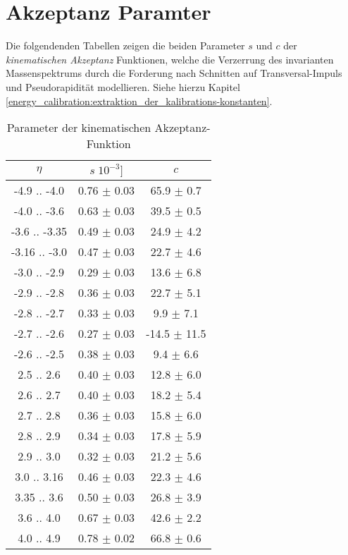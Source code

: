 


\chapter{Akzeptanz Paramter}
Die folgendenden Tabellen zeigen die beiden Parameter $s$ und $c$ der
\textit{kinematischen Akzeptanz} Funktionen, welche die Verzerrung des
invarianten Massenspektrums durch die Forderung nach Schnitten auf
Transversal-Impuls und Pseudorapidität modellieren. Siehe hierzu Kapitel
\ref{energy_calibration:extraktion_der_kalibrations-konstanten}.
\begin{table}[hb]
    \centering
    \begin{tabular}{|c|c|c|}
        \hline
        $\eta$ & $s \; 10^{-3}]$ & $c$  \\
        \hline \hline
        -4.9  .. -4.0  & 0.76 $\pm$ 0.03 &  65.9 $\pm$  0.7 \\
        -4.0  .. -3.6  & 0.63 $\pm$ 0.03 &  39.5 $\pm$  0.5 \\
        -3.6  .. -3.35 & 0.49 $\pm$ 0.03 &  24.9 $\pm$  4.2 \\
        -3.16 .. -3.0  & 0.47 $\pm$ 0.03 &  22.7 $\pm$  4.6 \\
        -3.0  .. -2.9  & 0.29 $\pm$ 0.03 &  13.6 $\pm$  6.8 \\
        -2.9  .. -2.8  & 0.36 $\pm$ 0.03 &  22.7 $\pm$  5.1 \\
        -2.8  .. -2.7  & 0.33 $\pm$ 0.03 &   9.9 $\pm$  7.1 \\
        -2.7  .. -2.6  & 0.27 $\pm$ 0.03 & -14.5 $\pm$ 11.5 \\
        -2.6  .. -2.5  & 0.38 $\pm$ 0.03 &   9.4 $\pm$  6.6 \\
        \hline\hline
         2.5  ..  2.6  & 0.40 $\pm$ 0.03 &  12.8 $\pm$  6.0 \\
         2.6  ..  2.7  & 0.40 $\pm$ 0.03 &  18.2 $\pm$  5.4 \\
         2.7  ..  2.8  & 0.36 $\pm$ 0.03 &  15.8 $\pm$  6.0 \\
         2.8  ..  2.9  & 0.34 $\pm$ 0.03 &  17.8 $\pm$  5.9 \\
         2.9  ..  3.0  & 0.32 $\pm$ 0.03 &  21.2 $\pm$  5.6 \\
         3.0  ..  3.16 & 0.46 $\pm$ 0.03 &  22.3 $\pm$  4.6 \\
         3.35 ..  3.6  & 0.50 $\pm$ 0.03 &  26.8 $\pm$  3.9 \\
         3.6  ..  4.0  & 0.67 $\pm$ 0.03 &  42.6 $\pm$  2.2 \\
         4.0  ..  4.9  & 0.78 $\pm$ 0.02 &  66.8 $\pm$  0.6 \\
         \hline
    \end{tabular}
    \caption{Parameter der kinematischen Akzeptanz-Funktion}
    \label{tab:acceptance_parameters}
\end{table}

